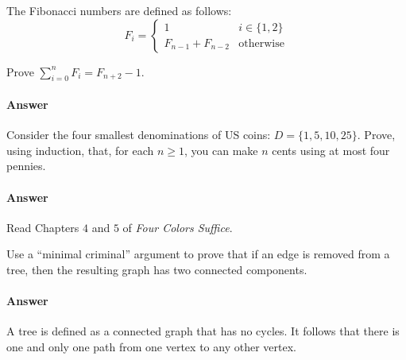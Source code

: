 \documentclass{article}
\begin{document}

\collab{\todo{}} 

The Fibonacci numbers are defined as follows:
$$
    F_i = \begin{cases}
            1 & i \in \{1,2\} \\
            F_{n-1}+F_{n-2} & \text{otherwise}
          \end{cases}
$$

Prove $\sum_{i=0}^n F_i = F_{n+2}-1$.

\paragraph{Answer}


\collab{\todo{}} 

Consider the four smallest denominations of US coins: $D=\{1,5,10,25\}$.  Prove, using
induction, that, for each $n \geq 1$, you can make $n$ cents using at most four
pennies.

\paragraph{Answer}


 

Read Chapters $4$ and $5$ of \emph{Four Colors Suffice}.

Use a ``minimal criminal'' argument to prove that if an edge is removed from a
tree, then the resulting graph has two connected components.

        \paragraph{Answer}

	A tree is defined as a connected graph that has no cycles. It follows that there is one and only one path from one vertex to any other vertex.
	
\end{document}
